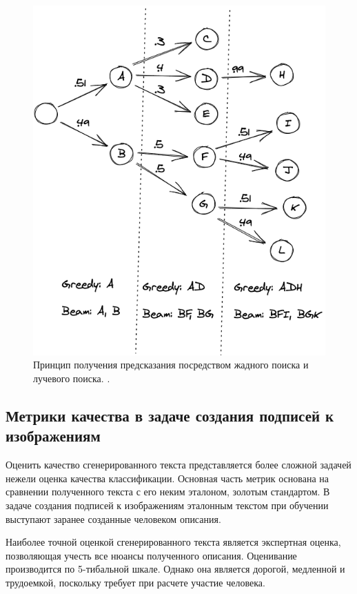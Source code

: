 \documentclass[a4paper,12pt]{extarticle}
\begin{document}
\begin{figure}[ht]
	\centering
	\includegraphics[scale=0.4]{beamsearch_vs_greedsearch.png}
	\caption{Принцип получения предсказания посредством жадного поиска и лучевого поиска.  \cite{vitalflux}.}
	\label{fig:beamsearch_vs_greedsearch}
\end{figure}

\subsection{Метрики качества в задаче создания подписей к изображениям}

Оценить качество сгенерированного текста представляется более сложной задачей нежели оценка качества классификации. Основная часть метрик основана на сравнении полученного текста с его неким эталоном, золотым стандартом. В задаче создания подписей к изображениям эталонным текстом при обучении выступают заранее созданные человеком описания.

Наиболее точной оценкой сгенерированного текста является экспертная оценка, позволяющая учесть все нюансы полученного описания. Оценивание производится по 5-тибальной шкале. Однако она является дорогой, медленной и трудоемкой, поскольку требует при расчете участие человека.
\end{document}
